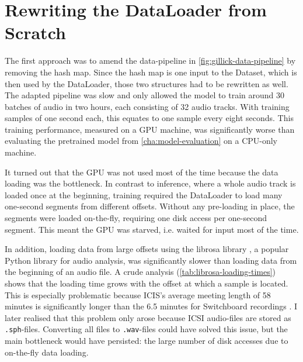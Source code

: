 \documentclass[bsc,frontabs,parskip,deptreport]{infthesis}
\begin{document}
\section{Rewriting the DataLoader from Scratch}

The first approach was to amend the data-pipeline in \autoref{fig:gillick-data-pipeline} by removing the hash map. Since the hash map is one input to the Dataset, which is then used by the DataLoader, those two structures had to be rewritten as well. 
The adapted pipeline was slow and only allowed the model to train around 30 batches of audio in two hours, each consisting of 32 audio tracks. 
With training samples of one second each, this equates to one sample every eight seconds.
This training performance, measured on a GPU machine, was significantly worse than evaluating the pretrained model from \autoref{cha:model-evaluation} on a CPU-only machine. 

It turned out that the GPU was not used most of the time because the data loading was the bottleneck. In contrast to inference, where a whole audio track is loaded once at the beginning, training required the DataLoader to load many one-second segments from different offsets. 
Without any pre-loading in place, the segments were loaded on-the-fly, requiring one disk access per one-second segment. This meant the GPU was starved, i.e. waited for input most of the time. 

In addition, loading data from large offsets using the librosa library \citep{mcfee2015librosa}, a popular Python library for audio analysis, was significantly slower than loading data from the beginning of an audio file. A crude analysis (\autoref{tab:librosa-loading-times}) shows that the loading time grows with the offset at which a sample is located. 
This is especially problematic because ICIS's average meeting length of 58 minutes \citep{icsi-ldc} is significantly longer than the 6.5 minutes for Switchboard recordings \citep{switchboard-ldc}.
I later realised that this problem only arose because ICSI audio-files are stored as \verb|.sph|-files. Converting all files to \verb|.wav|-files could have solved this issue, but the main bottleneck would have persisted: the large number of disk accesses due to on-the-fly data loading.
\end{document}
